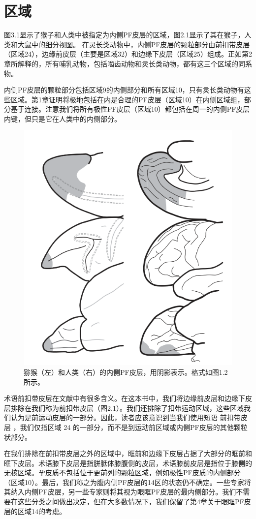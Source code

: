 \section{区域}

图3.1显示了猴子和人类中被指定为内侧PF皮层的区域，图2.1显示了其在猴子，人类和大鼠中的细分视图。
在灵长类动物中，内侧PF皮层的颗粒部分由前扣带皮层（区域24），边缘前皮层（主要是区域32）和边缘下皮层（区域25）组成。正如第2章所解释的，所有哺乳动物，包括啮齿动物和灵长类动物，都有这三个区域的同系物。\par
内侧PF皮层的颗粒部分包括区域9的内侧部分和所有区域10，只有灵长类动物有这些区域。第1章证明将极地包括在内是合理的PF皮层（区域10）在内侧区域组，部分基于连接。注意我们将所有极性PF皮层（区域10）都包括在周一的内侧PF皮层内键，但只是它在人类中的内侧部分。
\begin{figure}[!htb]
	\centering
	\includegraphics{image_pfc/Fig_3_1}
	\caption{猕猴（左）和人类（右）的内侧PF皮层，用阴影表示。格式如图1.2所示。}
	\label{fig:fig}
\end{figure}

术语前扣带皮层在文献中有很多含义。在这本书中，我们将边缘前皮层和边缘下皮层排除在我们称为前扣带皮层（图2.1）。我们还排除了扣带运动区域，这些区域我们认为是前运动皮层的一部分。因此，读者应该意识到当我们使用短语 前扣带皮层 ，我们仅指区域 24 的一部分，而不是到运动前区域或内侧PF皮层的其他颗粒状部分。\par
在我们排除在前扣带皮层之外的区域中，眶前和边缘下皮层占据了大部分的眶前和眶下皮层。术语膝下皮层是指胼胝体膝腹侧的皮层，术语膝前皮层是指位于膝侧的无核区域。孕皮质不包括位于更前列的颗粒区域，例如极性PF皮质的内侧部分（区域10）。最后，我们称之为腹内侧PF皮层的14区的状态仍不确定。一些专家将其纳入内侧PF皮层，另一些专家则将其视为眼眶PF皮层的最内侧部分。我们不需要在这些分类之间做出决定，但在大多数情况下，我们保留了第4章关于眼眶PF皮层的区域14的考虑。\par
